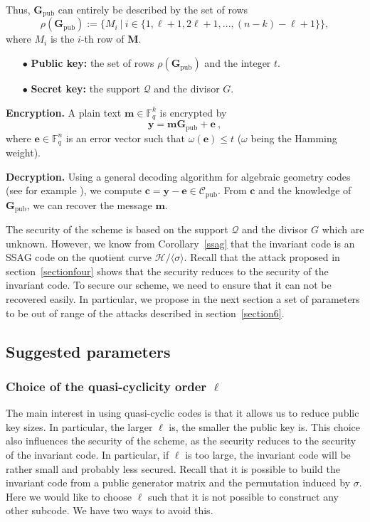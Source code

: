 \documentclass[10pt]{article}
\theoremstyle{definition}
\theoremstyle{definition}
\theoremstyle{definition}
\newcommand{\Fq}{\mathbb{F}_q}
\newcommand{\w}{\omega}
\newcommand{\QR}{\mathcal{Q}}
\begin{document}
 Thus, $\mathbf{G}_{\mathrm{pub}}$ can entirely be described by the set of rows
\[\rho(\mathbf{G}_{\mathrm{pub}}) := \{M_i \ | \ i \in \{1,\ell+1,2\ell+1,...,(n-k)-\ell+1\}\},\]
where $M_i$ is the $i$-th row of $\mathbf{M}$. 

\begin{enumerate}
\item[$\bullet$] \textbf{Public key:} the set of rows $\rho(\mathbf{G}_{\mathrm{pub}})$ and the integer $t$.
\item[$\bullet$] \textbf{Secret key:} the support $\QR$ and the divisor $G$.
\end{enumerate}

 \textbf{Encryption.} A plain text $\mathbf{m} \in \Fq^k$ is encrypted by 
\[ \mathbf{y}  = \mathbf{m}\mathbf{G}_{\mathrm{pub}} + \mathbf{e} \ ,\]
where $\mathbf{e} \in \Fq^n$ is an error vector such that $\w(\mathbf{e}) \leq t$ ($\w$ being the Hamming weight). 



 \textbf{Decryption.} Using a general decoding algorithm for algebraic geometry codes (see for example \cite{THRP}), we compute $\mathbf{c} = \mathbf{y} - \mathbf{e} \in \mathcal{C}_{\mathrm{pub}}$. From $\mathbf{c}$ and the knowledge of $\mathbf{G}_{\mathrm{pub}}$, we can recover the message $\mathbf{m}$. 



The security of the scheme is based on the support $\QR$ and the divisor $G$ which are unknown. However, we know from Corollary~\ref{ssag} that the invariant code is an SSAG code on the quotient curve $\mathcal{H}/\langle \sigma \rangle$. Recall that the attack proposed in section~\ref{sectionfour} shows that the security reduces to the security of the invariant code. To secure our scheme, we need to ensure that it can not be recovered easily. In particular, we propose in the next section a set of parameters to be out of range of the attacks described in section~\ref{section6}.


\subsection{Suggested parameters}


\subsubsection{Choice of the quasi-cyclicity order $\ell$} \label{choice of l}


The main interest in using quasi-cyclic codes is that it allows us to reduce public key sizes. In particular, the larger $\ell$ is, the smaller the public key is. This choice also influences the security of the scheme, as the security reduces to the security of the invariant code. In particular, if $\ell$ is too large, the invariant code will be rather small and probably less secured. Recall that it is possible to build the invariant code from a public generator matrix and the permutation induced by $\sigma$. Here we would like to choose $\ell$ such that it is not possible to construct any other subcode. We have two ways to avoid this.
\end{document}
